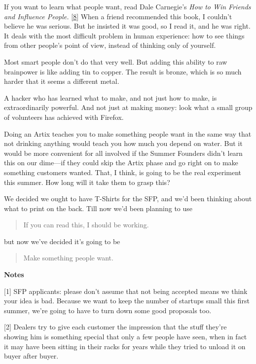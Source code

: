 If you want to learn what people want, read Dale Carnegie's \emph{How to
Win Friends and Influence People.} {[}\hyperref[f8n]{8}{]} When a friend
recommended this book, I couldn't believe he was serious. But he
insisted it was good, so I read it, and he was right. It deals with the
most difficult problem in human experience: how to see things from other
people's point of view, instead of thinking only of yourself.

Most smart people don't do that very well. But adding this ability to
raw brainpower is like adding tin to copper. The result is bronze, which
is so much harder that it seems a different metal.

A hacker who has learned what to make, and not just how to make, is
extraordinarily powerful. And not just at making money: look what a
small group of volunteers has achieved with Firefox.

Doing an Artix teaches you to make something people want in the same way
that not drinking anything would teach you how much you depend on water.
But it would be more convenient for all involved if the Summer Founders
didn't learn this on our dime---if they could skip the Artix phase and
go right on to make something customers wanted. That, I think, is going
to be the real experiment this summer. How long will it take them to
grasp this?

We decided we ought to have T-Shirts for the SFP, and we'd been thinking
about what to print on the back. Till now we'd been planning to use

\begin{quote}
If you can read this, I should be working.
\end{quote}

but now we've decided it's going to be

\begin{quote}
Make something people want.
\end{quote}

\textbf{Notes}

{[}1{]} SFP applicants: please don't assume that not being accepted
means we think your idea is bad. Because we want to keep the number of
startups small this first summer, we're going to have to turn down some
good proposals too.

{[}2{]} Dealers try to give each customer the impression that the stuff
they're showing him is something special that only a few people have
seen, when in fact it may have been sitting in their racks for years
while they tried to unload it on buyer after buyer.

